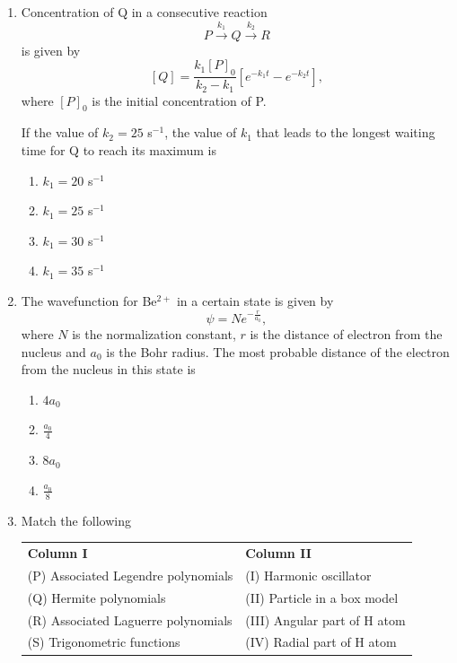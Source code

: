 \documentclass[journal,12pt,onecolumn]{IEEEtran}
\theoremstyle{remark}
\begin{document}
\begin{enumerate}
\newpage
\item Concentration of Q in a consecutive reaction 
\[
P \xrightarrow{k_1} Q \xrightarrow{k_2} R
\]
is given by
\[
[Q] = \frac{k_1[P]_0}{k_2 - k_1} \left[ e^{-k_1 t} - e^{-k_2 t} \right],
\]
where $[P]_0$ is the initial concentration of P.

If the value of $k_2 = 25$ s$^{-1}$, the value of $k_1$ that leads to the longest waiting time for Q to reach its maximum is
\begin{multicols}{2}
\begin{enumerate}
\item $k_1 = 20$ s$^{-1}$
\item $k_1 = 25$ s$^{-1}$
\item $k_1 = 30$ s$^{-1}$
\item $k_1 = 35$ s$^{-1}$
\end{enumerate}
\end{multicols}



\item The wavefunction for Be$^{2+}$ in a certain state is given by 
\[
\psi = N e^{-\frac{r}{a_0}},
\]
where $N$ is the normalization constant, $r$ is the distance of electron from the nucleus and $a_0$ is the Bohr radius. The most probable distance of the electron from the nucleus in this state is
\begin{multicols}{2}
\begin{enumerate}
\item $4a_0$
\item $\frac{a_0}{4}$
\item $8a_0$
\item $\frac{a_0}{8}$
\end{enumerate}
\end{multicols}

\item Match the following

\begin{tabular}{ll}
\textbf{Column I} & \textbf{Column II} \\
(P) Associated Legendre polynomials & (I) Harmonic oscillator \\
(Q) Hermite polynomials & (II) Particle in a box model \\
(R) Associated Laguerre polynomials & (III) Angular part of H atom \\
(S) Trigonometric functions & (IV) Radial part of H atom \\
\end{tabular}


\end{enumerate}
\end{document}
